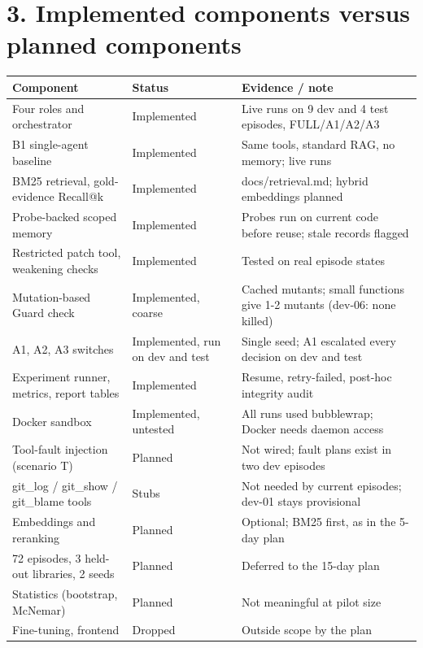 \documentclass[10pt,a4paper]{article}
\begin{document}
\section*{3. Implemented components versus planned components}
\begin{longtable}{|>{\raggedright\arraybackslash\footnotesize}p{}>{\raggedright\arraybackslash\footnotesize}p{}>{\raggedright\arraybackslash\footnotesize}p{}|}
\hline
\textbf{Component} & \textbf{Status} & \textbf{Evidence / note} \\ \hline\endhead
Four roles and orchestrator & Implemented & Live runs on 9 dev and 4 test episodes, FULL/A1/A2/A3 \\ \hline
B1 single-agent baseline & Implemented & Same tools, standard RAG, no memory; live runs \\ \hline
BM25 retrieval, gold-evidence Recall@k & Implemented & docs/retrieval.md; hybrid embeddings planned \\ \hline
Probe-backed scoped memory & Implemented & Probes run on current code before reuse; stale records flagged \\ \hline
Restricted patch tool, weakening checks & Implemented & Tested on real episode states \\ \hline
Mutation-based Guard check & Implemented, coarse & Cached mutants; small functions give 1-2 mutants (dev-06: none killed) \\ \hline
A1, A2, A3 switches & Implemented, run on dev and test & Single seed; A1 escalated every decision on dev and test \\ \hline
Experiment runner, metrics, report tables & Implemented & Resume, retry-failed, post-hoc integrity audit \\ \hline
Docker sandbox & Implemented, untested & All runs used bubblewrap; Docker needs daemon access \\ \hline
Tool-fault injection (scenario T) & Planned & Not wired; fault plans exist in two dev episodes \\ \hline
git\_log / git\_show / git\_blame tools & Stubs & Not needed by current episodes; dev-01 stays provisional \\ \hline
Embeddings and reranking & Planned & Optional; BM25 first, as in the 5-day plan \\ \hline
72 episodes, 3 held-out libraries, 2 seeds & Planned & Deferred to the 15-day plan \\ \hline
Statistics (bootstrap, McNemar) & Planned & Not meaningful at pilot size \\ \hline
Fine-tuning, frontend & Dropped & Outside scope by the plan \\ \hline
\end{longtable}
\end{document}
